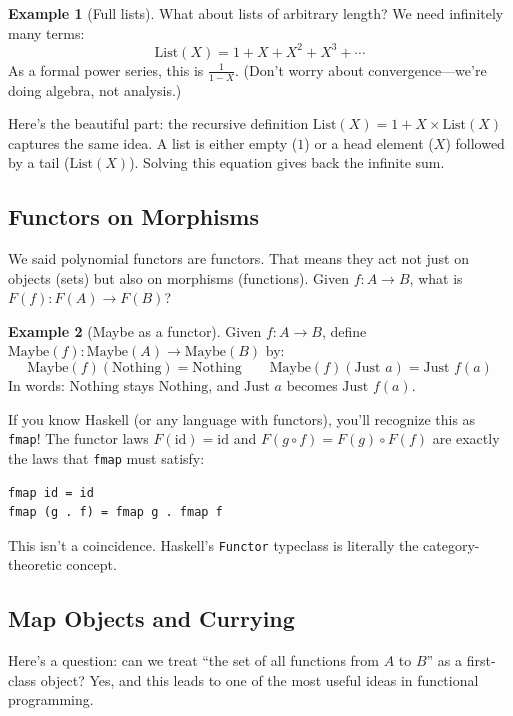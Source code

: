 \documentclass[11pt]{article}
\newcommand{\id}{\mathrm{id}}
\theoremstyle{definition}
\newtheorem{example}{Example}[section]
\theoremstyle{plain}
\theoremstyle{remark}
\begin{document}
\begin{example}[Full lists]
What about lists of arbitrary length? We need infinitely many terms:
\[
\text{List}(X) = 1 + X + X^2 + X^3 + \cdots
\]
As a formal power series, this is $\frac{1}{1-X}$. (Don't worry about convergence---we're doing algebra, not analysis.)

Here's the beautiful part: the recursive definition $\text{List}(X) = 1 + X \times \text{List}(X)$ captures the same idea. A list is either empty ($1$) or a head element ($X$) followed by a tail ($\text{List}(X)$). Solving this equation gives back the infinite sum.
\end{example}

\subsection{Functors on Morphisms}

We said polynomial functors are functors. That means they act not just on objects (sets) but also on morphisms (functions). Given $f: A \to B$, what is $F(f): F(A) \to F(B)$?

\begin{example}[Maybe as a functor]
Given $f: A \to B$, define $\text{Maybe}(f): \text{Maybe}(A) \to \text{Maybe}(B)$ by:
\[
\text{Maybe}(f)(\text{Nothing}) = \text{Nothing} \qquad \text{Maybe}(f)(\text{Just } a) = \text{Just } f(a)
\]
In words: $\text{Nothing}$ stays $\text{Nothing}$, and $\text{Just } a$ becomes $\text{Just } f(a)$.
\end{example}

\begin{programmingnote}
If you know Haskell (or any language with functors), you'll recognize this as \texttt{fmap}! The functor laws $F(\id) = \id$ and $F(g \circ f) = F(g) \circ F(f)$ are exactly the laws that \texttt{fmap} must satisfy:
\begin{verbatim}
fmap id = id
fmap (g . f) = fmap g . fmap f
\end{verbatim}
This isn't a coincidence. Haskell's \texttt{Functor} typeclass is literally the category-theoretic concept.
\end{programmingnote}

\subsection{Map Objects and Currying}

Here's a question: can we treat ``the set of all functions from $A$ to $B$'' as a first-class object? Yes, and this leads to one of the most useful ideas in functional programming.
\end{document}
